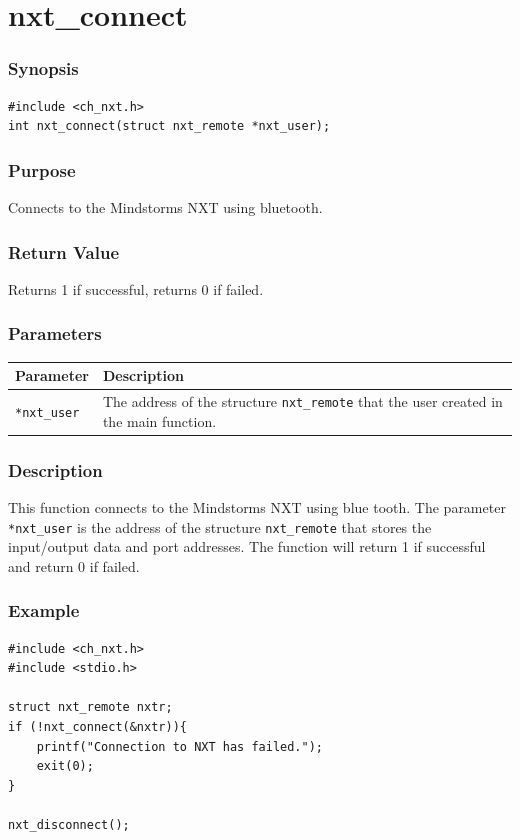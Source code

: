 \documentclass[12pt]{article}
\begin{document}
\section*{nxt\_connect}

\subsubsection*{Synopsis}
\begin{verbatim}
#include <ch_nxt.h>
int nxt_connect(struct nxt_remote *nxt_user);
\end{verbatim}

\subsubsection*{Purpose}
Connects to the Mindstorms NXT using bluetooth.

\subsubsection*{Return Value}
Returns 1 if successful, returns 0 if failed.

\subsubsection*{Parameters}
\begin{tabular}{ l | p{12cm} }
Parameter			& Description\\ \hline
\verb+*nxt_user+	& The address of the structure \verb+nxt_remote+
					  that the user created in the main function.
\end{tabular}

\subsubsection*{Description}
This function connects to the Mindstorms NXT using blue tooth. The parameter \verb+ *nxt_user+ is the address of the structure \verb+nxt_remote+ that stores the input/output data and port addresses. The function will return 1 if successful and return 0 if failed.

\subsubsection*{Example}
\begin{verbatim}
#include <ch_nxt.h> 
#include <stdio.h>

struct nxt_remote nxtr;
if (!nxt_connect(&nxtr)){
    printf("Connection to NXT has failed.");
    exit(0);
}
    
nxt_disconnect();
\end{verbatim}
\end{document}
